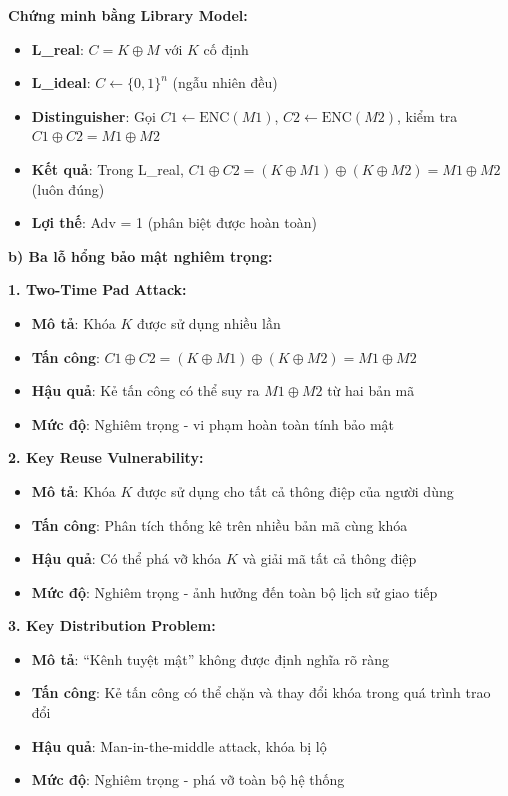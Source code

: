 \textbf{Chứng minh bằng Library Model:}
\begin{itemize}
    \item \textbf{L\_real}: $C = K \oplus M$ với $K$ cố định
    \item \textbf{L\_ideal}: $C \leftarrow \{0,1\}^n$ (ngẫu nhiên đều)
    \item \textbf{Distinguisher}: Gọi $C1 \leftarrow \text{ENC}(M1)$, $C2 \leftarrow \text{ENC}(M2)$, kiểm tra $C1 \oplus C2 = M1 \oplus M2$
    \item \textbf{Kết quả}: Trong L\_real, $C1 \oplus C2 = (K \oplus M1) \oplus (K \oplus M2) = M1 \oplus M2$ (luôn đúng)
    \item \textbf{Lợi thế}: Adv = 1 (phân biệt được hoàn toàn)
\end{itemize}

\textbf{b) Ba lỗ hổng bảo mật nghiêm trọng:}

\textbf{1. Two-Time Pad Attack:}
\begin{itemize}
    \item \textbf{Mô tả}: Khóa $K$ được sử dụng nhiều lần
    \item \textbf{Tấn công}: $C1 \oplus C2 = (K \oplus M1) \oplus (K \oplus M2) = M1 \oplus M2$
    \item \textbf{Hậu quả}: Kẻ tấn công có thể suy ra $M1 \oplus M2$ từ hai bản mã
    \item \textbf{Mức độ}: Nghiêm trọng - vi phạm hoàn toàn tính bảo mật
\end{itemize}

\textbf{2. Key Reuse Vulnerability:}
\begin{itemize}
    \item \textbf{Mô tả}: Khóa $K$ được sử dụng cho tất cả thông điệp của người dùng
    \item \textbf{Tấn công}: Phân tích thống kê trên nhiều bản mã cùng khóa
    \item \textbf{Hậu quả}: Có thể phá vỡ khóa $K$ và giải mã tất cả thông điệp
    \item \textbf{Mức độ}: Nghiêm trọng - ảnh hưởng đến toàn bộ lịch sử giao tiếp
\end{itemize}

\textbf{3. Key Distribution Problem:}
\begin{itemize}
    \item \textbf{Mô tả}: ``Kênh tuyệt mật'' không được định nghĩa rõ ràng
    \item \textbf{Tấn công}: Kẻ tấn công có thể chặn và thay đổi khóa trong quá trình trao đổi
    \item \textbf{Hậu quả}: Man-in-the-middle attack, khóa bị lộ
    \item \textbf{Mức độ}: Nghiêm trọng - phá vỡ toàn bộ hệ thống
\end{itemize}

